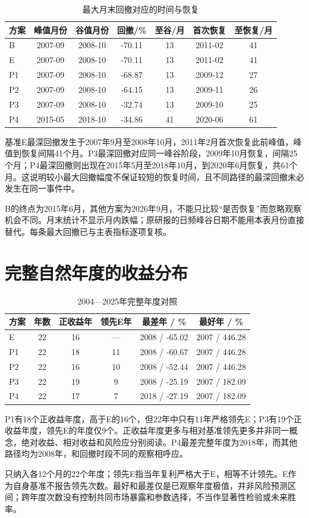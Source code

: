 \begin{table}[htbp]
\centering
\caption{最大月末回撤对应的时间与恢复}
\renewcommand{\arraystretch}{1.18}
\footnotesize
\setlength{\tabcolsep}{3pt}
\begin{tabularx}{\textwidth}{@{}p{1.15cm}*{6}{C}@{}}
\toprule
方案 & 峰值月份 & 谷值月份 & 回撤/\% & 至谷/月 & 首次恢复 & 至恢复/月 \\
\midrule
B & 2007-09 & 2008-10 & -70.11 & 13 & 2011-02 & 41 \\
E & 2007-09 & 2008-10 & -70.11 & 13 & 2011-02 & 41 \\
P1 & 2007-09 & 2008-10 & -68.87 & 13 & 2009-12 & 27 \\
P2 & 2007-09 & 2008-10 & -64.15 & 13 & 2009-11 & 26 \\
P3 & 2007-09 & 2008-10 & -32.74 & 13 & 2009-10 & 25 \\
P4 & 2015-05 & 2018-10 & -34.86 & 41 & 2020-06 & 61 \\
\bottomrule
\end{tabularx}
\end{table}

基准E最深回撤发生于2007年9月至2008年10月，2011年2月首次恢复此前峰值，峰值到恢复间隔41个月。P3最深回撤对应同一峰谷阶段，2009年10月恢复，间隔25个月；P4最深回撤则出现在2015年5月至2018年10月，到2020年6月恢复，共61个月。这说明较小最大回撤幅度不保证较短的恢复时间，且不同路径的最深回撤未必发生在同一事件中。

B的终点为2015年6月，其他方案为2026年9月，不能只比较“是否恢复”而忽略观察机会不同。月末统计不显示月内跌幅；原研报的日频峰谷日期不能用本表月份直接替代。每条最大回撤已与主表指标逐项复核。

\section{完整自然年度的收益分布}
\begin{table}[htbp]
\centering
\caption{2004—2025年完整年度对照}
\renewcommand{\arraystretch}{1.18}
\footnotesize
\setlength{\tabcolsep}{3pt}
\begin{tabularx}{\textwidth}{@{}p{1.15cm}*{5}{C}@{}}
\toprule
方案 & 年数 & 正收益年 & 领先E年 & 最差年 / \% & 最好年 / \% \\
\midrule
E & 22 & 16 & — & 2008 / -65.02 & 2007 / 446.28 \\
P1 & 22 & 18 & 11 & 2008 / -60.67 & 2007 / 446.28 \\
P2 & 22 & 16 & 10 & 2008 / -52.44 & 2007 / 446.28 \\
P3 & 22 & 19 & 9 & 2008 / -25.19 & 2007 / 182.09 \\
P4 & 22 & 17 & 7 & 2018 / -27.19 & 2007 / 182.09 \\
\bottomrule
\end{tabularx}
\end{table}

P1有18个正收益年度，高于E的16个，但22年中只有11年严格领先E；P3有19个正收益年度，领先E的年度仅9个。正收益年度更多与相对基准领先更多并非同一概念，绝对收益、相对收益和风险应分别阅读。P4最差完整年度为2018年，而其他路径均为2008年，和回撤时段不同的观察相呼应。

只纳入各12个月的22个年度；领先E指当年复利严格大于E，相等不计领先。E作为自身基准不报告领先次数。最好和最差仅是已观察年度极值，并非风险预测区间；跨年度次数没有控制共同市场暴露和参数选择，不当作显著性检验或未来胜率。
